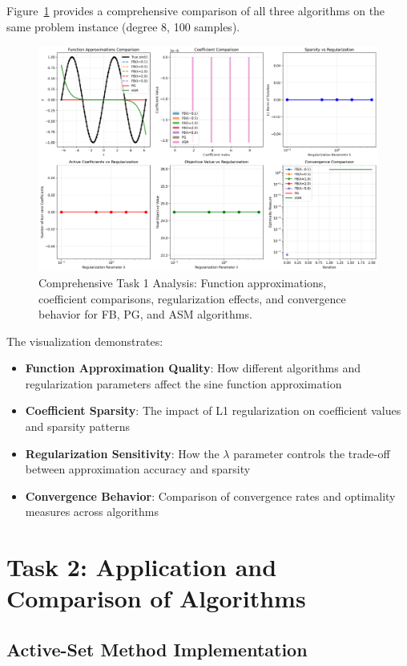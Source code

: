 \documentclass[11pt,a4paper]{article}
\begin{document}
Figure~\ref{fig:task1_comprehensive} provides a comprehensive comparison of all three algorithms on the same problem instance (degree 8, 100 samples).

\begin{figure}[h]
\centering
\includegraphics[width=\textwidth]{../results/plots/task1_comprehensive.png}
\caption{Comprehensive Task 1 Analysis: Function approximations, coefficient comparisons, regularization effects, and convergence behavior for FB, PG, and ASM algorithms.}
\label{fig:task1_comprehensive}
\end{figure}

The visualization demonstrates:
\begin{itemize}
    \item \textbf{Function Approximation Quality}: How different algorithms and regularization parameters affect the sine function approximation
    \item \textbf{Coefficient Sparsity}: The impact of L1 regularization on coefficient values and sparsity patterns
    \item \textbf{Regularization Sensitivity}: How the $\lambda$ parameter controls the trade-off between approximation accuracy and sparsity
    \item \textbf{Convergence Behavior}: Comparison of convergence rates and optimality measures across algorithms
\end{itemize}

\section{Task 2: Application and Comparison of Algorithms}

\subsection{Active-Set Method Implementation}
\end{document}
